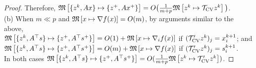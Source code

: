 {{\begin{proof}
Therefore, $\nops{\{z^k,Ax\}}{\{z^+,Ax^+\}}=O\big(\frac{1}{m+p}\nops{z^k}{\TVC z^k}\big)$. %
\\[5pt]
(b) When $m\ll p$ and $\nops{x}{\nabla f(x)}=O(m)$, by  arguments similar to the above,\\$\nops{\{z^k,A^\top s\}}{\{z^+,A^\top s^+\}}=O(1)+\nops{x}{\nabla_i f(x)}$ if $(\cT'_{\textnormal{CV}} z^k)_j=x_i^{k+1}$; and $\nops{\{z^k,A^\top s\}}{\{z^+,A^\top s^+\}}=O(m)+\nops{x}{\nabla f(x)}$ if $(\cT'_{\textnormal{CV}} z^k)_j=s_i^{k+1}$.\\ In both cases $\nops{\{z^k,A^\top s\}}{\{z^+,A^\top s^+\}}=O(\frac{1}{m+p}\nops{z^k}{\cT'_{\textnormal{CV}} z^k})$.
\end{proof}
}}
